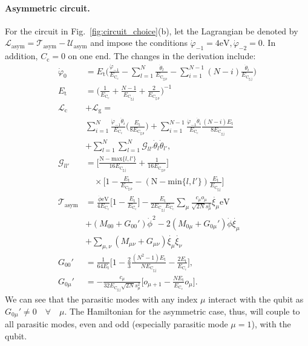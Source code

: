 \documentclass[%
reprint,
superscriptaddress,
 amsmath,amssymb,
 aps,
 prx,
longbibliography,
floatfix,
]{revtex4-2}
\begin{document}
\paragraph{Asymmetric circuit.} For the circuit in Fig.~\ref{fig:circuit_choice}(b), let the Lagrangian be denoted by $\mathcal{L}_\textrm{asym}=\mathcal{T}_\textrm{asym}-\mathcal{U}_\textrm{asym}$ and impose the conditions $\dot{\varphi}_{-1}=4\textrm{eV}, \dot{\varphi}_{-2}=0$. In addition, $C_\textrm{c}=0$ on one end. The changes in the derivation include:
\begin{align}
\dot{\varphi}_0&=E_{\textrm{t}}\Big(\frac{\dot{\varphi}_{-1}}{E_{\textrm{C}_\textrm{c}}}-\sum_{l=1}^{N}\frac{\dot{\theta}_l}{E_{\textrm{C}_\textrm{g,p}}}-\sum_{i=1}^{N-1}(N-i)\frac{\dot{\theta}_i}{E_{\textrm{C}_\textrm{g,j}}}\Big)\\
E_\textrm{t}&=\Big(\frac{1}{E_{\textrm{C}_\textrm{c}}}+\frac{N-1}{E_{\textrm{C}_\textrm{g,j}}}+\frac{2}{E_{\textrm{C}_\textrm{g,p}}}\Big)^{-1}\\
\mathcal{L}_\textrm{c}&+\mathcal{L}_\textrm{g}
=\nonumber\\&\sum_{i=1}^N\frac{\dot{\varphi}_{-1}\dot{\theta}_i}{E_{\textrm{C}_\textrm{c}}}\Big(\frac{E_\textrm{t}}{8E_{\textrm{C}_\textrm{g,p}}}\Big)+\sum_{i=1}^{N-1}\frac{\dot{\varphi}_{-1}\dot{\theta}_i}{E_{\textrm{C}_\textrm{c}}}\frac{(N-i)E_\textrm{t}}{8E_{\textrm{C}_\textrm{g,j}}}\nonumber\\
&+\sum_{l=1}^{N}\sum_{l=1}^{N}\mathcal{G}_{ll'}\dot{\theta}_l\dot{\theta}_{l'},\\
\mathcal{G}_{ll'}&=\Big[\frac{\textrm{N}-\text{max}\{l,l'\}}{16E_{\textrm{C}_\textrm{g,j}}}+\frac{1}{16E_{\textrm{C}_\textrm{g,p}}}\Big]\nonumber\\&\quad\times\Big[1-\frac{E_\textrm{t}}{E_{\textrm{C}_\textrm{g,p}}}-(\textrm{N}-\text{min}\{l,l'\})\frac{E_\textrm{t}}{E_{\textrm{C}_\textrm{g,j}}}\Big]\\
\mathcal{T}_\textrm{asym}&=\frac{\dot{\phi}\textrm{eV}}{4E_{\textrm{C}_\textrm{c}}}\Big[1-\frac{E_\textrm{t}}{E_{\textrm{C}_\textrm{c}}}\Big]-\frac{E_{\textrm{t}}}{2E_{\textrm{C}_\textrm{g,j}}E_{\textrm{C}_\textrm{c}}} \sum_\mu\frac{c_\mu o_\mu}{\sqrt{2N}s_\mu^2} \dot{\xi_\mu}\textrm{eV}\nonumber\\&+(M_{00}+G_{00}')\dot{\phi}^2-2(M_{0\mu}+G_{0\mu}')\dot{\phi}\dot{\xi_\mu}\nonumber\\&+\sum_{\mu,\nu}(M_{\mu\nu}+G_{\mu\nu})\dot{\xi_\mu}\dot{\xi_\nu}\\
G_{00}'&=\frac{1}{64E_{\textrm{t}}}\Bigg[1-\frac{2}{3}\frac{(N^2-1)E_\textrm{t}}{NE_{\textrm{C}_\textrm{g,j}}}-\frac{2E_\textrm{t}}{E_{\textrm{C}_\textrm{c}}}\Bigg],\\
G_{0\mu}'&=-\frac{c_\mu}{32E_{\textrm{C}_\textrm{g,j}}\sqrt{2N}s_\mu^2}\Bigg[o_{\mu+1}-\frac{NE_\textrm{t}}{E_{\textrm{C}_\textrm{c}}}o_{\mu}\Bigg].
\end{align}
We can see that the parasitic modes with any index $\mu$ interact with the qubit as $G_{0\mu}'\neq 0\quad \forall\quad\mu$. The Hamiltonian for the asymmetric case, thus, will couple to all parasitic modes, even and odd (especially parasitic mode $\mu=1$), with the qubit.
\end{document}
